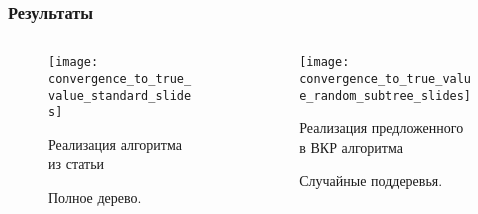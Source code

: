 \documentclass[unicode, notheorems]{beamer}
\begin{document}
\begin{frame}
    \frametitle{Результаты}
    \begin{columns}
        \begin{column}{0.5\textwidth}
            \begin{figure}[h]
                \centering
                \texttt{[image: convergence\_to\_true\_value\_standard\_slides]}
                \caption{Полное дерево.}
                \label{fig:true_value_test_standard}
                \footnotesize{Реализация алгоритма из статьи}
            \end{figure}
        \end{column}
        \begin{column}{0.5\textwidth}
            \begin{figure}[h]
                \centering
                \texttt{[image: convergence\_to\_true\_value\_random\_subtree\_slides]}
                \caption{Случайные поддеревья.}
                \label{fig:random_subtree_modified_ev}
                \footnotesize{Реализация предложенного в ВКР алгоритма}
            \end{figure}
        \end{column}
        
    \end{columns}
\end{frame}
\end{document}
